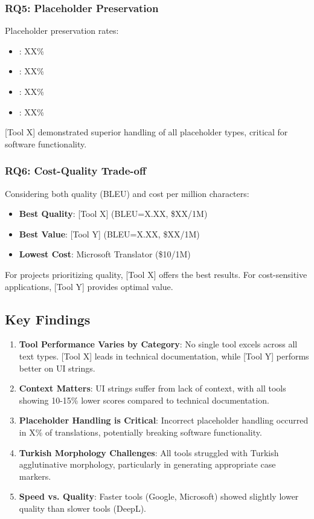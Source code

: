 \subsubsection{RQ5: Placeholder Preservation}

Placeholder preservation rates:
\begin{itemize}
    \item [Tool X]: XX\%
    \item [Tool Y]: XX\%
    \item [Tool Z]: XX\%
    \item [Tool W]: XX\%
\end{itemize}

[Tool X] demonstrated superior handling of all placeholder types, critical for software functionality.

\subsubsection{RQ6: Cost-Quality Trade-off}

Considering both quality (BLEU) and cost per million characters:
\begin{itemize}
    \item \textbf{Best Quality}: [Tool X] (BLEU=X.XX, \$XX/1M)
    \item \textbf{Best Value}: [Tool Y] (BLEU=X.XX, \$XX/1M)
    \item \textbf{Lowest Cost}: Microsoft Translator (\$10/1M)
\end{itemize}

For projects prioritizing quality, [Tool X] offers the best results. For cost-sensitive applications, [Tool Y] provides optimal value.

\subsection{Key Findings}

\begin{enumerate}
    \item \textbf{Tool Performance Varies by Category}: No single tool excels across all text types. [Tool X] leads in technical documentation, while [Tool Y] performs better on UI strings.
    
    \item \textbf{Context Matters}: UI strings suffer from lack of context, with all tools showing 10-15\% lower scores compared to technical documentation.
    
    \item \textbf{Placeholder Handling is Critical}: Incorrect placeholder handling occurred in X\% of translations, potentially breaking software functionality.
    
    \item \textbf{Turkish Morphology Challenges}: All tools struggled with Turkish agglutinative morphology, particularly in generating appropriate case markers.
    
    \item \textbf{Speed vs. Quality}: Faster tools (Google, Microsoft) showed slightly lower quality than slower tools (DeepL).
\end{enumerate}

